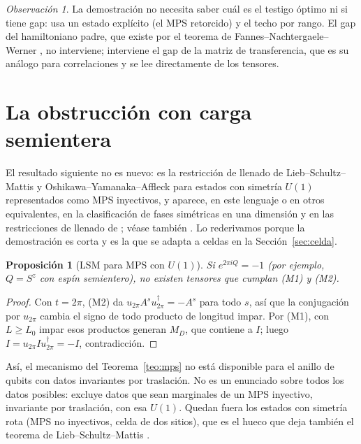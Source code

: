\documentclass[11pt,a4paper]{article}
\newtheorem{proposicion}[teorema]{Proposición}
\theoremstyle{remark}
\newtheorem*{observacion}{Observación}
\begin{document}
\begin{observacion}
La demostración no necesita saber cuál es el testigo óptimo ni si tiene gap: usa un estado
explícito (el MPS retorcido) y el techo por rango. El gap del hamiltoniano padre, que existe por
el teorema de Fannes--Nachtergaele--Werner \cite{fnw}, no interviene; interviene el gap de la matriz de
transferencia, que es su análogo para correlaciones y se lee directamente de los tensores.
\end{observacion}

\section{La obstrucción con carga semientera}\label{sec:lsm}

El resultado siguiente no es nuevo: es la restricción de llenado de Lieb--Schultz--Mattis y
Oshikawa--Yamanaka--Affleck \cite{lsm,oya} para estados con simetría $U(1)$ representados como MPS
inyectivos, y aparece, en este lenguaje o en otros equivalentes, en la clasificación de fases
simétricas en una dimensión \cite{chen-gu-wen,sanz} y en las restricciones de llenado de
\cite{wpvz}; véase también \cite{tasaki-lsm}. Lo rederivamos porque la demostración es corta y es
la que se adapta a celdas en la Sección~\ref{sec:celda}.

\begin{proposicion}[LSM para MPS con $U(1)$]\label{prop:lsm}
Si $e^{2\pi iQ}=-1$ (por ejemplo, $Q=S^z$ con espín semientero), no existen tensores que cumplan
(M1) y (M2).
\end{proposicion}

\begin{proof}
Con $t=2\pi$, (M2) da $u_{2\pi}A^su_{2\pi}^\dagger=-A^s$ para todo $s$, así que la conjugación por
$u_{2\pi}$ cambia el signo de todo producto de longitud impar. Por (M1), con $L\ge L_0$ impar esos
productos generan $M_D$, que contiene a $I$; luego $I=u_{2\pi}Iu_{2\pi}^\dagger=-I$, contradicción.
\end{proof}

Así, el mecanismo del Teorema~\ref{teo:mps} no está disponible para el anillo de qubits con datos
invariantes por traslación. No es un enunciado sobre todos los datos posibles: excluye datos que
sean marginales de un MPS inyectivo, invariante por traslación, con esa $U(1)$. Quedan fuera los
estados con simetría rota (MPS no inyectivos, celda de dos sitios), que es el hueco que deja también
el teorema de Lieb--Schultz--Mattis \cite{lsm,tasaki-lsm}.
\end{document}
